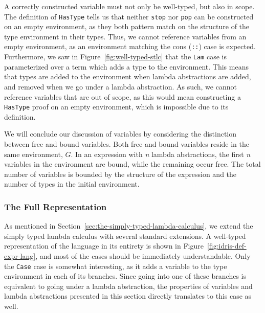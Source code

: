 A correctly constructed variable must not only be well-typed, but also in scope. The definition of \texttt{HasType} tells us that neither \texttt{stop} nor \texttt{pop} can be constructed on an empty environment, as they both pattern match on the structure of the type environment in their types. Thus, we cannot reference variables from an empty environment, as an environment matching the cons (\texttt{::}) case is expected. Furthermore, we saw in Figure~\ref{fig:well-typed-stlc} that the \texttt{Lam} case is parameterized over a term which adds a type to the environment. This means that types are added to the environment when lambda abstractions are added, and removed when we go under a lambda abstraction. As such, we cannot reference variables that are out of scope, as this would mean constructing a \texttt{HasType} proof on an empty environment, which is impossible due to its definition. 

We will conclude our discussion of variables by considering the distinction between free and bound variables. Both free and bound variables reside in the same environment, $G$. In an expression with \textit{n} lambda abstractions, the first \textit{n} variables in the environment are bound, while the remaining occur free. The total number of variables is bounded by the structure of the expression and the number of types in the initial environment.


\subsubsection{The Full Representation}
As mentioned in Section~\ref{sec:the-simply-typed-lambda-calculus}, we extend the simply typed lambda calculus with several standard extensions. A well-typed representation of the language in its entirety is shown in Figure~\ref{fig:idris-def-expr-lang}, and most of the cases should be immediately understandable. Only the \texttt{Case} case is somewhat interesting, as it adds a variable to the type environment in each of its branches. Since going into one of these branches is equivalent to going under a lambda abstraction, the properties of variables and lambda abstractions presented in this section directly translates to this case as well.

